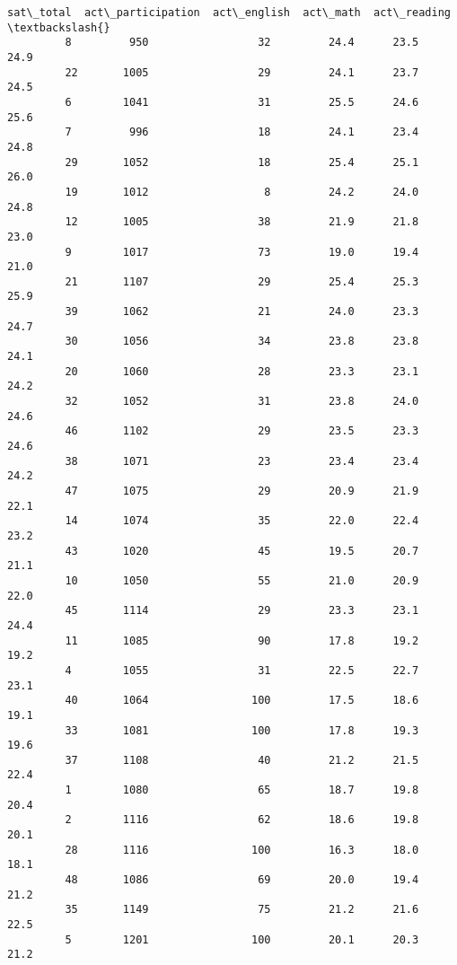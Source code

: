 \documentclass[11pt]{article}
\begin{document}
\begin{Verbatim}[commandchars=\\\{\}]
             sat\_total  act\_participation  act\_english  act\_math  act\_reading  \textbackslash{}
         8         950                 32         24.4      23.5         24.9   
         22       1005                 29         24.1      23.7         24.5   
         6        1041                 31         25.5      24.6         25.6   
         7         996                 18         24.1      23.4         24.8   
         29       1052                 18         25.4      25.1         26.0   
         19       1012                  8         24.2      24.0         24.8   
         12       1005                 38         21.9      21.8         23.0   
         9        1017                 73         19.0      19.4         21.0   
         21       1107                 29         25.4      25.3         25.9   
         39       1062                 21         24.0      23.3         24.7   
         30       1056                 34         23.8      23.8         24.1   
         20       1060                 28         23.3      23.1         24.2   
         32       1052                 31         23.8      24.0         24.6   
         46       1102                 29         23.5      23.3         24.6   
         38       1071                 23         23.4      23.4         24.2   
         47       1075                 29         20.9      21.9         22.1   
         14       1074                 35         22.0      22.4         23.2   
         43       1020                 45         19.5      20.7         21.1   
         10       1050                 55         21.0      20.9         22.0   
         45       1114                 29         23.3      23.1         24.4   
         11       1085                 90         17.8      19.2         19.2   
         4        1055                 31         22.5      22.7         23.1   
         40       1064                100         17.5      18.6         19.1   
         33       1081                100         17.8      19.3         19.6   
         37       1108                 40         21.2      21.5         22.4   
         1        1080                 65         18.7      19.8         20.4   
         2        1116                 62         18.6      19.8         20.1   
         28       1116                100         16.3      18.0         18.1   
         48       1086                 69         20.0      19.4         21.2   
         35       1149                 75         21.2      21.6         22.5   
         5        1201                100         20.1      20.3         21.2   

\end{Verbatim}
\end{document}
